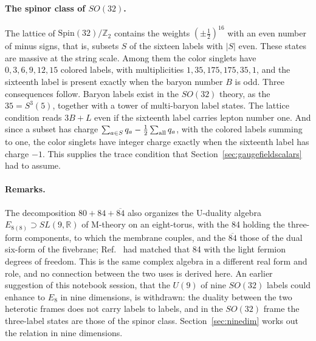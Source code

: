 \paragraph{The spinor class of $SO(32)$.}
The lattice of $\mathrm{Spin}(32)/\mathbb Z_2$ contains the weights
$(\pm\tfrac12)^{16}$ with an even number of minus signs, that is,
subsets $S$ of the sixteen labels with $|S|$ even. These states are
massive at the string scale. Among them the color singlets have
$0,3,6,9,12,15$ colored labels, with multiplicities
$1,35,175,175,35,1$, and the sixteenth label is present exactly when the
baryon number $B$ is odd. Three consequences follow. Baryon labels exist
in the $SO(32)$ theory, as the $35=S^3(5)$, together with a tower of
multi-baryon label states. The lattice condition reads $3B+L$ even if
the sixteenth label carries lepton number one. And since a subset has
charge $\sum_{a\in S}q_a-\tfrac12\sum_{\rm all}q_a$, with the colored
labels summing to one, the color singlets have integer charge exactly
when the sixteenth label has charge $-1$. This supplies the trace
condition that Section~\ref{sec:gaugefieldscalars} had to assume.

\paragraph{Remarks.}
The decomposition $80+84+\overline{84}$ also organizes the U-duality
algebra $E_{8(8)}\supset SL(9,\mathbb R)$ of M-theory on an eight-torus,
with the 84 holding the three-form components, to which the membrane
couples, and the $\overline{84}$ those of the dual six-form of the
fivebrane; Ref.~\cite{Rivero2009} had matched that 84 with the light
fermion degrees of freedom. This is the same complex algebra in a
different real form and role, and no connection between the two uses is
derived here. An earlier suggestion of this notebook session, that the
$U(9)$ of nine $SO(32)$ labels could enhance to $E_8$ in nine
dimensions, is withdrawn: the duality between the two heterotic frames
does not carry labels to labels, and in the $SO(32)$ frame the
three-label states are those of the spinor class. Section~\ref{sec:ninedim}
works out the relation in nine dimensions.
